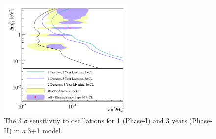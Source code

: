 \documentclass[11pt]{article}
\numberwithin{equation}{section}
\begin{document}
 \begin{figure}[h]
\centering
\includegraphics*[width=0.6\textwidth]{./sensitivity.PNG}
\caption[PROSPECT sensitivity]{The 3 $\sigma$ sensitivity to oscillations for 1 (Phase-I) and 3 years (Phase-II) in a 3+1 model.}
\label{fig:sensitivity}
\end{figure}
\end{document}
